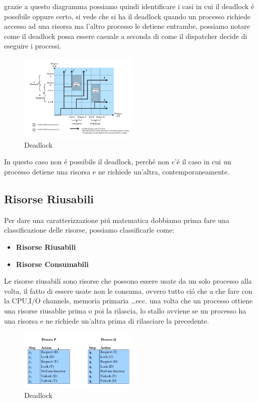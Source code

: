 grazie a questo diagramma possiamo quindi identificare i casi in cui il deadlock é possibile oppure certo, si vede che
si ha il deadlock quando un processo richiede accesso ad una risorsa ma l'altro processo le detiene entrambe, possiamo notare come
il deadlock possa essere casuale a seconda di come il dispatcher decide di eseguire i processi.
\begin{figure}[H]
    \centering
    \includegraphics[width=0.5\textwidth]{immagini/JointProcessDiagramNoDeadlock}
    \caption{Deadlock}
\end{figure}
In questo caso non é possibile il deadlock, perché non c'é il caso in cui un processo detiene una risorsa e ne richiede
un'altra, contemporaneamente.
\subsection{Risorse Riusabili}
Per dare una caratterizzazione piú matematica dobbiamo prima fare una classificazione delle risorse, possiamo classificarle come:
\begin{itemize}
    \item \textbf{Risorse Riusabili}
    \item \textbf{Risorse Consumabili}
\end{itemize}
Le risorse riusabili sono risorse che possono essere usate da un solo processo alla volta, il fatto di essere usate non le consuma, ovvero
tutto ció che a che fare con la CPU,I/O channels, memoria primaria \dots ecc. una volta che un processo ottiene una risorse riusablie
prima o poi la rilascia, lo stallo avviene se un processo ha una risorsa e ne richiede un'altra prima di rilasciare la precedente.
\begin{figure}[H]
    \centering
    \includegraphics[width=0.5\textwidth]{immagini/EsempiRisorseRiusabili}
    \caption{Deadlock}
\end{figure}
